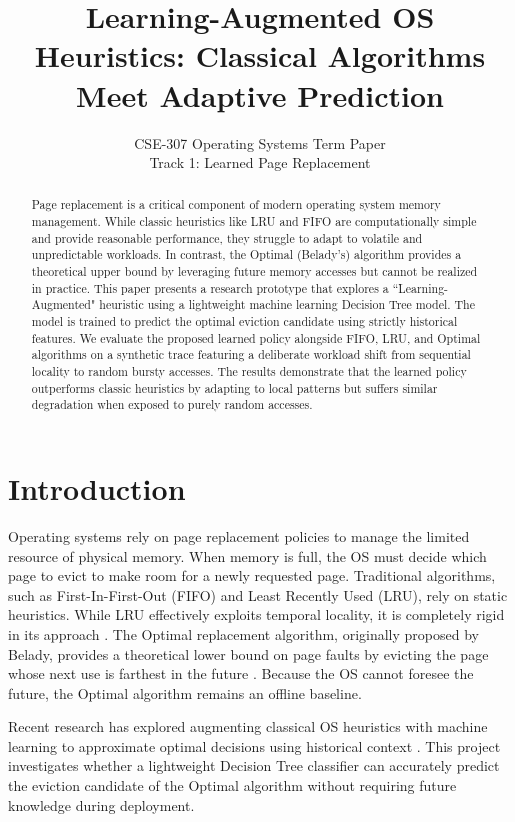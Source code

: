 \documentclass[10pt,twocolumn,letterpaper]{article}
\title{\Large \bf Learning-Augmented OS Heuristics: Classical Algorithms Meet Adaptive Prediction}
\author{CSE-307 Operating Systems Term Paper \\ Track 1: Learned Page Replacement}
\date{}
\begin{document}
\maketitle

\begin{abstract}
Page replacement is a critical component of modern operating system memory management. While classic heuristics like LRU and FIFO are computationally simple and provide reasonable performance, they struggle to adapt to volatile and unpredictable workloads. In contrast, the Optimal (Belady's) algorithm provides a theoretical upper bound by leveraging future memory accesses but cannot be realized in practice. This paper presents a research prototype that explores a ``Learning-Augmented" heuristic using a lightweight machine learning Decision Tree model. The model is trained to predict the optimal eviction candidate using strictly historical features. We evaluate the proposed learned policy alongside FIFO, LRU, and Optimal algorithms on a synthetic trace featuring a deliberate workload shift from sequential locality to random bursty accesses. The results demonstrate that the learned policy outperforms classic heuristics by adapting to local patterns but suffers similar degradation when exposed to purely random accesses. 
\end{abstract}

\section{Introduction}
Operating systems rely on page replacement policies to manage the limited resource of physical memory. When memory is full, the OS must decide which page to evict to make room for a newly requested page. Traditional algorithms, such as First-In-First-Out (FIFO) and Least Recently Used (LRU), rely on static heuristics. While LRU effectively exploits temporal locality, it is completely rigid in its approach \cite{denning1970virtual}. The Optimal replacement algorithm, originally proposed by Belady, provides a theoretical lower bound on page faults by evicting the page whose next use is farthest in the future \cite{belady1966study}. Because the OS cannot foresee the future, the Optimal algorithm remains an offline baseline.

Recent research has explored augmenting classical OS heuristics with machine learning to approximate optimal decisions using historical context \cite{mitzenmacher2018model}. This project investigates whether a lightweight Decision Tree classifier can accurately predict the eviction candidate of the Optimal algorithm without requiring future knowledge during deployment.
\end{document}
